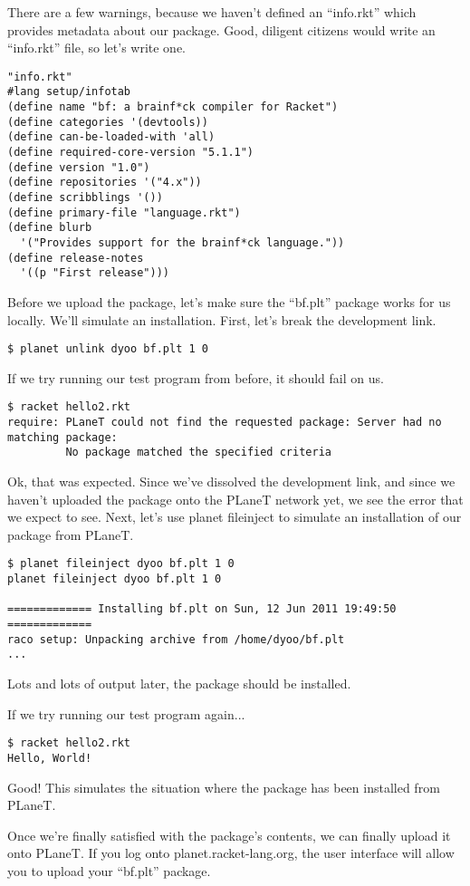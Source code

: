 \documentclass{article}
\begin{document}
There are a few warnings, because we haven't defined an ``info.rkt'' which provides metadata about our package. Good, diligent citizens would write an ``info.rkt'' file, so let's write one.
\begin{verbatim}
"info.rkt"
#lang setup/infotab
(define name "bf: a brainf*ck compiler for Racket")
(define categories '(devtools))
(define can-be-loaded-with 'all)
(define required-core-version "5.1.1")
(define version "1.0")
(define repositories '("4.x"))
(define scribblings '())
(define primary-file "language.rkt")
(define blurb
  '("Provides support for the brainf*ck language."))
(define release-notes
  '((p "First release")))
\end{verbatim}
Before we upload the package, let's make sure the ``bf.plt'' package works for us locally. We'll simulate an installation. First, let's break the development link.
\begin{verbatim}
$ planet unlink dyoo bf.plt 1 0
\end{verbatim}
If we try running our test program from before, it should fail on us.
\begin{verbatim}
$ racket hello2.rkt
require: PLaneT could not find the requested package: Server had no matching package:
         No package matched the specified criteria
\end{verbatim}
Ok, that was expected. Since we've dissolved the development link, and since we haven't uploaded the package onto the PLaneT network yet, we see the error that we expect to see.
Next, let's use planet fileinject to simulate an installation of our package from PLaneT.
\begin{verbatim}
$ planet fileinject dyoo bf.plt 1 0
planet fileinject dyoo bf.plt 1 0
 
============= Installing bf.plt on Sun, 12 Jun 2011 19:49:50 =============
raco setup: Unpacking archive from /home/dyoo/bf.plt
...
\end{verbatim}
Lots and lots of output later, the package should be installed.


If we try running our test program again...
\begin{verbatim}
$ racket hello2.rkt
Hello, World!
\end{verbatim}
Good! This simulates the situation where the package has been installed from PLaneT.

Once we're finally satisfied with the package's contents, we can finally upload it onto PLaneT. If you log onto planet.racket-lang.org, the user interface will allow you to upload your ``bf.plt'' package.
\end{document}
